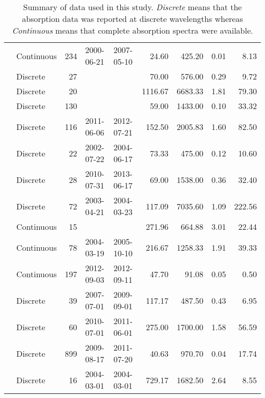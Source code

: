 \begin{table}[ht]
\begin{tabular}{llrllrrrr}
  \citet{Osburn2007} & Continuous & 234 & 2000-06-21 & 2007-05-10 & 24.60 & 425.20 & 0.01 & 8.13 \\ 
  \citet{Osburn2009} & Discrete &  27 &  &  & 70.00 & 576.00 & 0.29 & 9.72 \\ 
  \citet{Osburn2011} & Discrete &  20 &  &  & 1116.67 & 6683.33 & 1.81 & 79.30 \\ 
  \citet{Osburn2016} & Discrete & 130 &  &  & 59.00 & 1433.00 & 0.10 & 33.32 \\ 
  \citet{Polaris2012} & Discrete & 116 & 2011-06-06 & 2012-07-21 & 152.50 & 2005.83 & 1.60 & 82.50 \\ 
  \citet{Retamal2007} & Discrete &  22 & 2002-07-22 & 2004-06-17 & 73.33 & 475.00 & 0.12 & 10.60 \\ 
  \citet{Shen2014} & Discrete &  28 & 2010-07-31 & 2013-06-17 & 69.00 & 1538.00 & 0.36 & 32.40 \\ 
  \citet{Sickman2010} & Discrete &  72 & 2003-04-21 & 2004-03-23 & 117.09 & 7035.60 & 1.09 & 222.56 \\ 
  \citet{Stedmon2007a} & Continuous &  15 &  &  & 271.96 & 664.88 & 3.01 & 22.44 \\ 
  \citet{Stedmon2011} & Continuous &  78 & 2004-03-19 & 2005-10-10 & 216.67 & 1258.33 & 1.91 & 39.33 \\ 
  \citet{Stedmon2015} & Continuous & 197 & 2012-09-03 & 2012-09-11 & 47.70 & 91.08 & 0.05 & 0.50 \\ 
  \citet{Tehrani2013} & Discrete &  39 & 2007-07-01 & 2009-09-01 & 117.17 & 487.50 & 0.43 & 6.95 \\ 
  \citet{Wagner2015} & Discrete &  60 & 2010-07-01 & 2011-06-01 & 275.00 & 1700.00 & 1.58 & 56.59 \\ 
  \citet{Werdell2003} & Discrete & 899 & 2009-08-17 & 2011-07-20 & 40.63 & 970.70 & 0.04 & 17.74 \\ 
  \citet{Zhang2005} & Discrete &  16 & 2004-03-01 & 2004-03-01 & 729.17 & 1682.50 & 2.64 & 8.55 \\ 
   \hline
\end{tabular}
\endgroup
\caption{Summary of data used in this study. \textit{Discrete} means that the 
absorption data was reported at discrete wavelengths whereas 
\textit{Continuous} means that complete absorption spectra were available.} 
\end{table}

